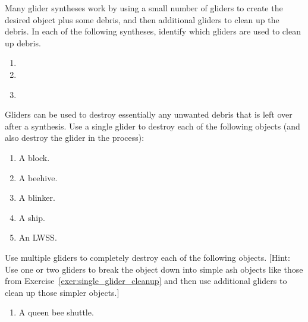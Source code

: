 \vspace*{-0.4cm}\hrulefill\vspace*{-0.3cm}\footnotesize\begin{multicols}{2}\vspace*{-0.4cm}\raggedcolumns{}
\setlength{\parskip}{0pt}

\begin{problem}\label{exer:glider_cleanup}
	Many glider syntheses work by using a small number of gliders to create the desired object plus some debris, and then additional gliders to clean up the debris. In each of the following syntheses, identify which gliders are used to clean up debris.
	\begin{enumerate}[label=(\alph*),series=exer_glider_cleanup]
		\item {}
		\item {}
		\item {}\\
	\end{enumerate}
\end{problem}


\mfilbreak


\begin{problem}\label{exer:single_glider_cleanup}
	Gliders can be used to destroy essentially any unwanted debris that is left over after a synthesis. Use a single glider to destroy each of the following objects (and also destroy the glider in the process):
	\begin{enumerate}[label=(\alph*),series=exer_glider_cleanup]
		\item A block.
		
		\item A beehive.
		
		\item A blinker.
		
		\item A ship.
		
		\item An LWSS.
	\end{enumerate}
\end{problem}


\mfilbreak


\begin{problem}\label{exer:multiple_glider_cleanup}
	Use multiple gliders to completely destroy each of the following objects. [Hint: Use one or two gliders to break the object down into simple ash objects like those from Exercise~\ref{exer:single_glider_cleanup} and then use additional gliders to clean up those simpler objects.]
	\begin{enumerate}[label=(\alph*),series=exer_glider_cleanup]
		\item A queen bee shuttle.
		

\end{enumerate}
\end{problem}
\end{multicols}
